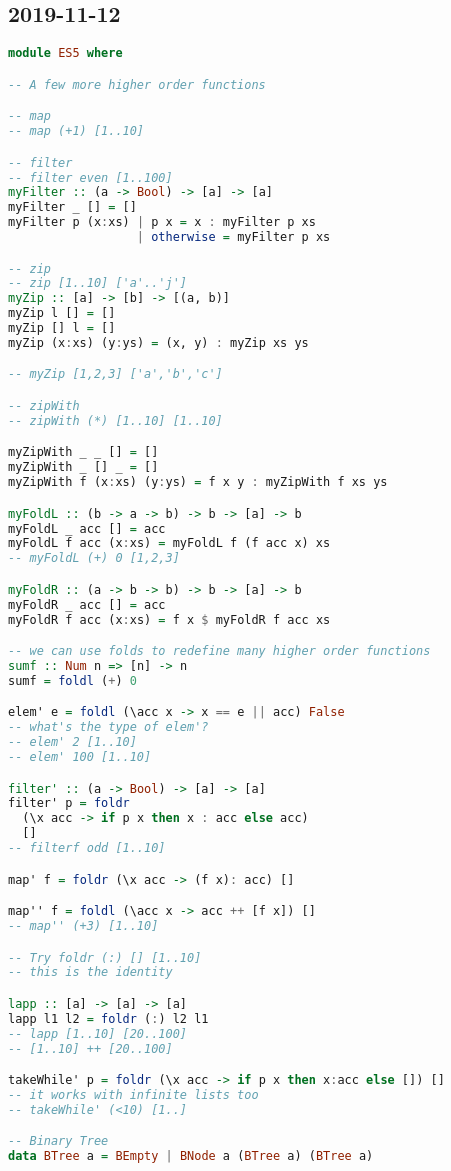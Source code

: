 \subsection{2019-11-12}
\begin{lstlisting}[language=Haskell]
module ES5 where

-- A few more higher order functions

-- map
-- map (+1) [1..10]

-- filter
-- filter even [1..100]
myFilter :: (a -> Bool) -> [a] -> [a]
myFilter _ [] = []
myFilter p (x:xs) | p x = x : myFilter p xs
                  | otherwise = myFilter p xs

-- zip
-- zip [1..10] ['a'..'j']
myZip :: [a] -> [b] -> [(a, b)]
myZip l [] = []
myZip [] l = []
myZip (x:xs) (y:ys) = (x, y) : myZip xs ys

-- myZip [1,2,3] ['a','b','c']

-- zipWith
-- zipWith (*) [1..10] [1..10]

myZipWith _ _ [] = []
myZipWith _ [] _ = []
myZipWith f (x:xs) (y:ys) = f x y : myZipWith f xs ys

myFoldL :: (b -> a -> b) -> b -> [a] -> b
myFoldL _ acc [] = acc
myFoldL f acc (x:xs) = myFoldL f (f acc x) xs
-- myFoldL (+) 0 [1,2,3]

myFoldR :: (a -> b -> b) -> b -> [a] -> b
myFoldR _ acc [] = acc
myFoldR f acc (x:xs) = f x $ myFoldR f acc xs

-- we can use folds to redefine many higher order functions
sumf :: Num n => [n] -> n
sumf = foldl (+) 0

elem' e = foldl (\acc x -> x == e || acc) False
-- what's the type of elem'?
-- elem' 2 [1..10]
-- elem' 100 [1..10]

filter' :: (a -> Bool) -> [a] -> [a]
filter' p = foldr
  (\x acc -> if p x then x : acc else acc)
  []
-- filterf odd [1..10]

map' f = foldr (\x acc -> (f x): acc) []

map'' f = foldl (\acc x -> acc ++ [f x]) []
-- map'' (+3) [1..10]

-- Try foldr (:) [] [1..10]
-- this is the identity

lapp :: [a] -> [a] -> [a]
lapp l1 l2 = foldr (:) l2 l1
-- lapp [1..10] [20..100]
-- [1..10] ++ [20..100]

takeWhile' p = foldr (\x acc -> if p x then x:acc else []) []
-- it works with infinite lists too
-- takeWhile' (<10) [1..]

-- Binary Tree
data BTree a = BEmpty | BNode a (BTree a) (BTree a)


\end{lstlisting}
